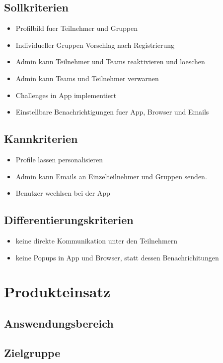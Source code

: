 \documentclass[10pt,a4paper]{article}
\begin{document}
	\subsection{Sollkriterien}
	\begin{itemize}
			\item Profilbild fuer Teilnehmer und Gruppen
			\item Individueller Gruppen Vorschlag nach Registrierung
			\item Admin kann Teilnehmer und Teams reaktivieren und loeschen
			\item Admin kann Teams und Teilnehmer verwarnen
			\item Challenges in App implementiert
			\item Einstellbare Benachrichtigungen fuer App, Browser und Emails
		\end{itemize}
	\subsection{Kannkriterien}
	\begin{itemize}
			\item Profile lassen personalisieren
			\item Admin kann Emails an Einzelteilnehmer und Gruppen senden.
			\item Benutzer wechlsen bei der App
	\end{itemize}
	\subsection{Differentierungskriterien}
	\begin{itemize}
		\item keine direkte Kommunikation unter den Teilnehmern
		\item keine Popups in App und Browser, statt dessen Benachrichitungen 
	\end{itemize}

\section{Produkteinsatz}
\subsection{Answendungsbereich}
\subsection{Zielgruppe}
\end{document}

